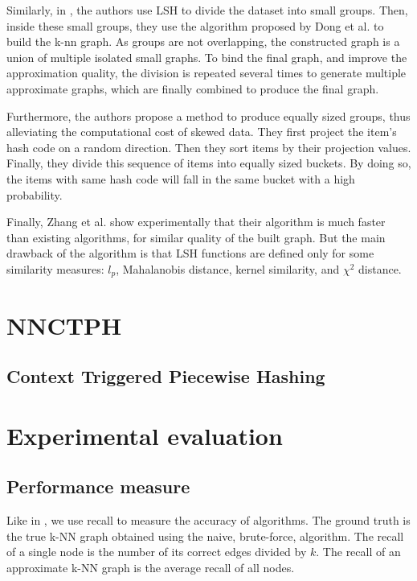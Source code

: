 \documentclass[wcp]{jmlr}
\begin{document}
Similarly, in \cite{Zhang2013}, the authors use LSH to divide the dataset into small groups. Then, inside these small groups, they use the algorithm proposed by Dong et al. to build the k-nn graph. As groups are not overlapping, the constructed graph is a union of multiple isolated small graphs. To bind the final graph, and improve the approximation quality, the division is repeated several times to generate multiple approximate graphs, which are finally combined to produce the final graph.

Furthermore, the authors propose a method to produce equally sized groups, thus alleviating the computational cost of skewed data. They first project the item's hash code on a random direction. Then they sort items by their projection values. Finally, they divide this sequence of items into equally sized buckets. By doing so, the items with same hash code will fall in the same bucket with a high probability.

Finally, Zhang et al. show experimentally that their algorithm is much faster than existing algorithms, for similar quality of the built graph. But the main drawback of the algorithm is that LSH functions are defined only for some similarity measures: $l_p$, Mahalanobis distance, kernel similarity, and $\chi^2$ distance.


\section{NNCTPH}

\subsection{Context Triggered Piecewise Hashing}

\section{Experimental evaluation}

\subsection{Performance measure}

Like in \cite{Dong2011}, we use recall to measure the accuracy of algorithms. The ground truth is the true k-NN graph obtained using the naive, brute-force, algorithm. The recall of a single node is the number of its correct edges divided by $k$. The recall of an approximate k-NN graph is the average recall of all nodes.
\end{document}

